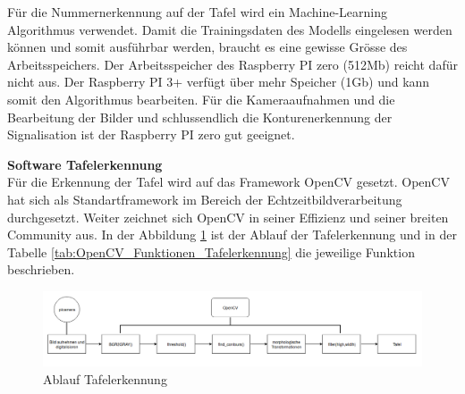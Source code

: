 \documentclass[../../main.tex]{subfiles}
\begin{document}
    Für die Nummernerkennung auf der Tafel wird ein Machine-Learning Algorithmus verwendet. Damit die Trainingsdaten des Modells eingelesen werden können und somit ausführbar werden, braucht es eine gewisse Grösse des Arbeitsspeichers. Der Arbeitsspeicher des Raspberry PI zero (512Mb) reicht dafür nicht aus. Der Raspberry PI 3+ verfügt über mehr Speicher (1Gb) und kann somit den Algorithmus bearbeiten. Für die Kameraaufnahmen und die Bearbeitung der Bilder und schlussendlich die Konturenerkennung der Signalisation ist der Raspberry PI zero  gut geeignet.
    \pagebreak

    \textbf{Software Tafelerkennung}\\
    Für die Erkennung der Tafel wird auf das Framework OpenCV gesetzt. OpenCV hat sich als Standartframework im Bereich der Echtzeitbildverarbeitung durchgesetzt. Weiter zeichnet sich OpenCV in seiner Effizienz und seiner breiten Community aus. In der Abbildung \ref{fig:ablauf_tafelerkennung} ist der Ablauf der Tafelerkennung und in der Tabelle \ref{tab:OpenCV_Funktionen_Tafelerkennung} die jeweilige Funktion beschrieben.



    \begin{figure}[H] %
        \centering
        \includegraphics[width=1\textwidth]{Ablauf_Tafelerkennung.png}
        \caption{Ablauf Tafelerkennung}
        \label{fig:ablauf_tafelerkennung}
    \end{figure}
\end{document}
